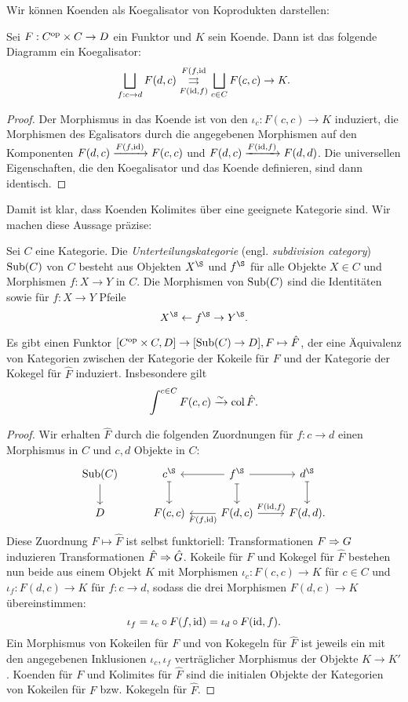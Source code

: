 Wir können Koenden als Koegalisator von Koprodukten darstellen:
\begin{lemma} \label{coend-coeq}
  Sei $F: C^\mathrm{op} \times C \to D$ ein Funktor und $K$ sein Koende. Dann
  ist das folgende Diagramm ein Koegalisator:
  \[ \bigsqcup_{f: c \to d} F(d, c)
  \overset{F(f, \operatorname{id}}{\underset{F(\operatorname{id}, f)}{\rightrightarrows}}
  \bigsqcup_{c \in C} F(c, c) \to K. \]
\end{lemma}
\begin{proof}
  Der Morphismus in das Koende ist von den $\iota_c: F(c, c) \to K$
  induziert, die Morphismen des Egalisators durch die angegebenen
  Morphismen auf den Komponenten $F(d, c) \xrightarrow{F(f, \operatorname{id})} F(c,
  c)$ und $F(d, c) \xrightarrow{F(\operatorname{id}, f)} F(d, d)$. Die universellen
  Eigenschaften, die den Koegalisator und das Koende definieren, sind
  dann identisch.
\end{proof}
Damit ist klar, dass Koenden Kolimites über eine geeignete Kategorie
sind. Wir machen diese Aussage präzise:
\begin{defn} \label{def:sub}
  Sei $C$ eine Kategorie. Die \emph{Unterteilungskategorie}
  (engl. \emph{subdivision category}) $\operatorname{Sub}(C)$ von $C$ besteht aus
  Objekten $X^\S$ und $f^\S$ für alle Objekte $X \in C$ und Morphismen
  $f: X \to Y$ in $C$. Die Morphismen von $\operatorname{Sub}(C)$ sind die
  Identitäten sowie für $f: X \to Y$ Pfeile
  \[ X^\S \from f^\S \to Y^\S. \]
\end{defn}
\begin{prop} \label{coend-col}
  Es gibt einen Funktor $[C^\mathrm{op} \times C, D] \to [\operatorname{Sub}(C) \to D], F
  \mapsto \hat{F}$, der eine Äquivalenz von Kategorien zwischen der
  Kategorie der Kokeile für $F$ und der Kategorie der Kokegel für
  $\hat{F}$ induziert. Insbesondere gilt
  \[ \int^{c \in C} F(c, c) \xrightarrow[]{\sim} \operatorname{col} \hat{F}. \]
\end{prop}
\begin{proof}
  Wir erhalten $\hat{F}$ durch die folgenden Zuordnungen für $f: c \to
  d$ einen Morphismus in $C$ und $c, d$ Objekte in $C$:
  \[ \begin{tikzcd}
    \Sub(C) \arrow{d}
    & c^\S \arrow[mapsto]{d}
    & \arrow{l} f^\S \arrow[mapsto]{d} \arrow{r}
    & d^\S \arrow[mapsto]{d} \\
    D
    & F(c, c)
    & \arrow{l}{F(f, \id)} F(d, c) \arrow{r}{F(\id, f)}
    & F(d, d).
  \end{tikzcd} \]
  Diese Zuordnung $F \mapsto \hat{F}$ ist selbst funktoriell:
  Transformationen $F \Rightarrow G$ induzieren Transformationen $\hat{F}
  \Rightarrow \hat{G}$. Kokeile für $F$ und Kokegel für $\hat{F}$ bestehen
  nun beide aus einem Objekt $K$ mit Morphismen $\iota_c: F(c, c) \to
  K$ für $c \in C$ und $\iota_f: F(d, c) \to K$ für $f: c \to d$,
  sodass die drei Morphismen $F(d, c) \to K$ übereinstimmen:
  \[ \iota_f = \iota_c \circ F(f, \operatorname{id}) = \iota_d \circ F(\operatorname{id}, f). \]
  Ein Morphismus von Kokeilen für $F$ und von Kokegeln für $\hat{F}$
  ist jeweils ein mit den angegebenen Inklusionen $\iota_c, \iota_f$
  verträglicher Morphismus der Objekte $K \to K'$. Koenden für $F$ und
  Kolimites für $\hat{F}$ sind die initialen Objekte der Kategorien
  von Kokeilen für $F$ bzw. Kokegeln für $\hat{F}$.
\end{proof}
